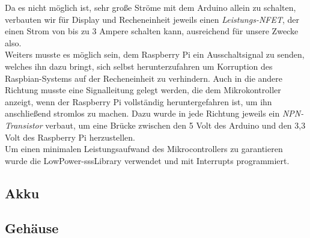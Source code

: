 Da es nicht möglich ist, sehr große Ströme mit dem Arduino allein zu schalten, verbauten wir für Display und Recheneinheit jeweils einen \textit{Leistungs-NFET}, der einen Strom von bis zu 3 Ampere schalten kann, ausreichend für unsere Zwecke also.\\

Weiters musste es möglich sein, dem Raspberry Pi ein Ausschaltsignal zu senden, welches ihn dazu bringt, sich selbst herunterzufahren um Korruption des Raspbian-Systems auf der Recheneinheit zu verhindern. Auch in die andere Richtung musste eine Signalleitung gelegt werden, die dem Mikrokontroller anzeigt, wenn der Raspberry Pi vollständig heruntergefahren ist, um ihn anschließend stromlos zu machen. Dazu wurde in jede Richtung jeweils ein \textit{NPN-Transistor} verbaut, um eine Brücke zwischen den 5 Volt des Arduino und den 3,3 Volt des Raspberry Pi herzustellen.\\

Um einen minimalen Leistungsaufwand des Mikrocontrollers zu garantieren wurde die LowPower-sssLibrary verwendet und mit Interrupts programmiert.

\subsection{Akku}

\subsection{Gehäuse}

